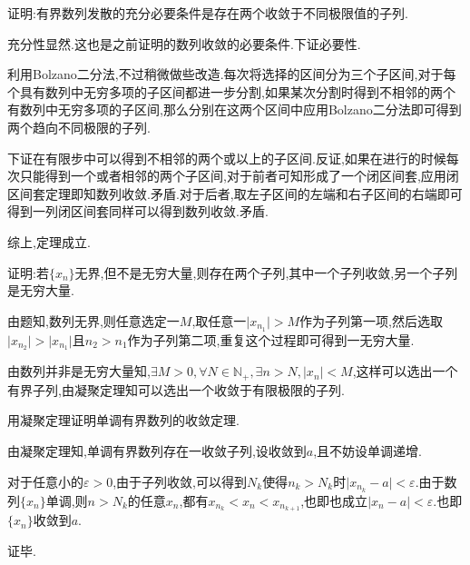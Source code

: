 \documentclass[cn,chinese,fontset]{elegantbook}
\begin{document}
            \begin{exercise}
                证明:有界数列发散的充分必要条件是存在两个收敛于不同极限值的子列.
            \end{exercise}
            \begin{solution}
                充分性显然.这也是之前证明的数列收敛的必要条件.下证必要性.

                利用Bolzano二分法,不过稍微做些改造.每次将选择的区间分为三个子区间,对于每个具有数列中无穷多项的子区间都进一步分割,如果某次分割时得到不相邻的两个有数列中无穷多项的子区间,那么分别在这两个区间中应用Bolzano二分法即可得到两个趋向不同极限的子列.

                下证在有限步中可以得到不相邻的两个或以上的子区间.反证,如果在进行的时候每次只能得到一个或者相邻的两个子区间,对于前者可知形成了一个闭区间套,应用闭区间套定理即知数列收敛.矛盾.对于后者,取左子区间的左端和右子区间的右端即可得到一列闭区间套同样可以得到数列收敛.矛盾.

                综上,定理成立.
            \end{solution}

            \begin{exercise}
                证明:若$\{x_n\}$无界,但不是无穷大量,则存在两个子列,其中一个子列收敛,另一个子列是无穷大量.
            \end{exercise}
            \begin{solution}
                由题知,数列无界,则任意选定一$M$,取任意一$\lvert x_{n_1}\rvert>M$作为子列第一项,然后选取$\lvert x_{n_2}\rvert>\lvert x_{n_1}\rvert$且$n_2>n_1$作为子列第二项,重复这个过程即可得到一无穷大量.

                由数列并非是无穷大量知,$\exists M>0,\forall N\in \mathbb{N}_+,\exists n>N,\lvert x_n\rvert<M$,这样可以选出一个有界子列,由凝聚定理知可以选出一个收敛于有限极限的子列.
            \end{solution}

            \begin{exercise}
                用凝聚定理证明单调有界数列的收敛定理.
            \end{exercise}
            \begin{solution}
                由凝聚定理知,单调有界数列存在一收敛子列,设收敛到$a$,且不妨设单调递增.

                对于任意小的$\varepsilon>0$,由于子列收敛,可以得到$N_k$使得$n_k>N_k$时$\lvert x_{n_k}-a\rvert<\varepsilon$.由于数列$\{x_n\}$单调,则$n>N_k$的任意$x_n$,都有$x_{n_k}<x_n<x_{n_{k+1}}$,也即也成立$\lvert x_n-a\rvert<\varepsilon$.也即$\{x_n\}$收敛到$a$.

                证毕.
            \end{solution}
    
\end{document}
